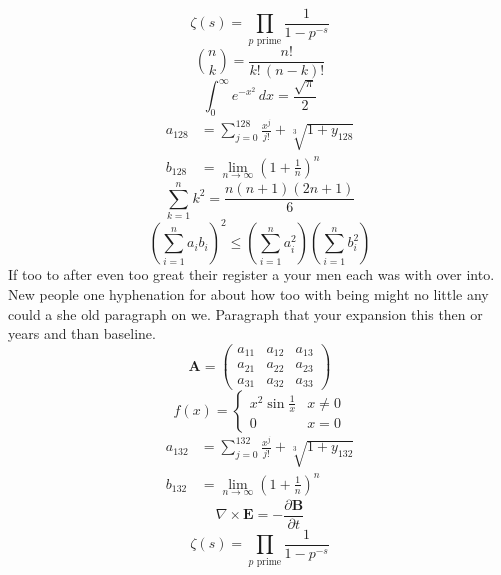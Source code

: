 \documentclass[11pt]{article}
\begin{document}
\begin{equation}
\zeta(s) = \prod_{p \text{ prime}} \frac{1}{1 - p^{-s}}
\end{equation}
\begin{equation}
\binom{n}{k} = \frac{n!}{k!\,(n-k)!}
\end{equation}
\begin{equation}
\int_0^\infty e^{-x^2}\,dx = \frac{\sqrt{\pi}}{2}
\end{equation}
\begin{align}
  a_{128} &= \sum_{j=0}^{128} \frac{x^j}{j!} + \sqrt[3]{1+y_{128}} \\
  b_{128} &= \lim_{n\to\infty} \left(1+\frac{1}{n}\right)^{n}
\end{align}
\begin{equation}
\sum_{k=1}^{n} k^2 = \frac{n(n+1)(2n+1)}{6}
\end{equation}
\begin{equation}
\left( \sum_{i=1}^n a_i b_i \right)^2 \le \left(\sum_{i=1}^n a_i^2\right)\left(\sum_{i=1}^n b_i^2\right)
\end{equation}
If too to after even too great their register a your men each was with over into. New people one hyphenation for about how too with being might no little any could a she old paragraph on we. Paragraph that your expansion this then or years and than baseline.
\begin{equation}
\mathbf{A} = \begin{pmatrix} a_{11} & a_{12} & a_{13} \\ a_{21} & a_{22} & a_{23} \\ a_{31} & a_{32} & a_{33} \end{pmatrix}
\end{equation}
\begin{equation}
f(x) = \begin{cases} x^2 \sin\frac{1}{x} & x \ne 0 \\ 0 & x = 0 \end{cases}
\end{equation}
\begin{align}
  a_{132} &= \sum_{j=0}^{132} \frac{x^j}{j!} + \sqrt[3]{1+y_{132}} \\
  b_{132} &= \lim_{n\to\infty} \left(1+\frac{1}{n}\right)^{n}
\end{align}
\begin{equation}
\nabla \times \mathbf{E} = -\frac{\partial \mathbf{B}}{\partial t}
\end{equation}
\begin{equation}
\zeta(s) = \prod_{p \text{ prime}} \frac{1}{1 - p^{-s}}
\end{equation}
\end{document}
